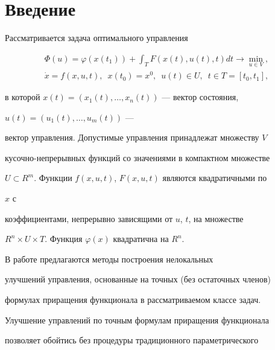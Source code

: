 \maketitle


\label{begin}








\section{Введение}





Рассматривается задача оптимального управления


\begin{gather}


\Phi(u)=\varphi(x(t_1))+\int_T F(x(t),u(t),t)dt\to\min_{u\in V},\\


\Dot x=f(x,u,t),\ \; x(t_0)=x^0,\ \; u(t)\in U,


\ \; t\in T=[t_0,t_1],


\end{gather}


в которой $x(t)=(x_1(t),\dotsc,x_n(t))$ --- вектор состояния, 


$u(t)=(u_1(t),\dotsc,u_m(t))$ ---


вектор управления. Допустимые управления принадлежат множеству $V$


кусочно-непрерывных функций со значениями в компактном множестве


$U\subset R^m$. Функции $f(x,u,t)$, $F(x,u,t)$ являются квадратичными по 


$x$ с 


коэффициентами, непрерывно зависящими от $u$, $t$, на множестве 


$R^n\times U\times T$. Функция $\varphi(x)$ квадратична на $R^n$.





В работе предлагаются методы построения нелокальных 


улучшений управления, основанные на точных (без остаточных членов) 


формулах приращения функционала в рассматриваемом классе задач. 


Улучшение управлений по точным формулам приращения функционала 


позволяет обойтись без процедуры традиционного параметрического 


